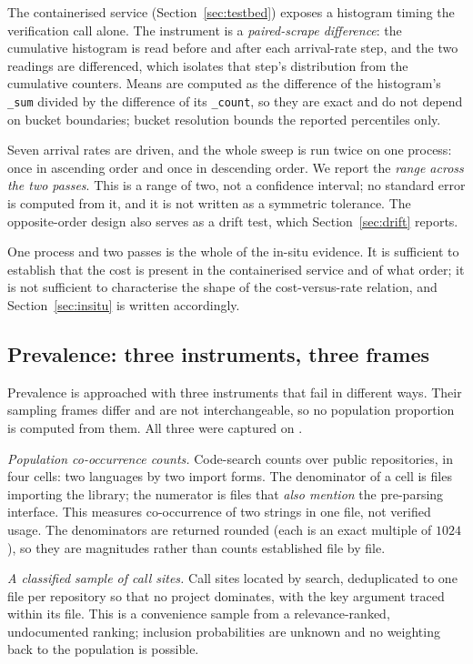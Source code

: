 \documentclass[preprint,12pt,authoryear]{elsarticle}
\begin{document}
The containerised service (Section~\ref{sec:testbed}) exposes a histogram timing the verification call alone. The
instrument is a \emph{paired-scrape difference}: the cumulative histogram is read
before and after each arrival-rate step, and the two readings are differenced,
which isolates that step's distribution from the cumulative counters. Means are
computed as the difference of the histogram's \texttt{\_sum} divided by the
difference of its \texttt{\_count}, so they are exact and do not depend on bucket
boundaries; bucket resolution bounds the reported percentiles only.

Seven arrival rates are driven, and the whole sweep is run twice on one process:
once in ascending order and once in descending order. We report the \emph{range
across the two passes}. This is a range of two, not a confidence interval; no
standard error is computed from it, and it is not written as a symmetric
tolerance. The opposite-order design also serves as a drift test, which
Section~\ref{sec:drift} reports.

One process and two passes is the whole of the in-situ evidence. It is sufficient
to establish that the cost is present in the containerised service and of what order; it is not
sufficient to characterise the shape of the cost-versus-rate relation, and
Section~\ref{sec:insitu} is written accordingly.

\subsection{Prevalence: three instruments, three frames}\label{sec:frames}

Prevalence is approached with three instruments that fail in different ways.
Their sampling frames differ and are not interchangeable, so no population
proportion is computed from them. All three were captured on \PopCapturedAt.

\emph{Population co-occurrence counts.} Code-search counts over public
repositories, in four cells: two languages by two import forms. The denominator
of a cell is files importing the library; the numerator is files that \emph{also
mention} the pre-parsing interface. This measures co-occurrence of two strings in
one file, not verified usage. The denominators are returned rounded (each is
an exact multiple of $1024$), so they are magnitudes rather than counts
established file by file.

\emph{A classified sample of call sites.} Call sites located by search,
deduplicated to one file per repository so that no project dominates, with the
key argument traced within its file. This is a convenience sample from a
relevance-ranked, undocumented ranking; inclusion probabilities are unknown and
no weighting back to the population is possible.
\end{document}
